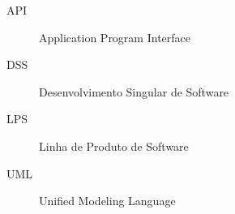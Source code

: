 
\begin{description}
  \item[API] Application Program Interface
  \item[DSS] Desenvolvimento Singular de Software
  \item[LPS] Linha de Produto de Software
  \item[UML] Unified Modeling Language
\end{description}
